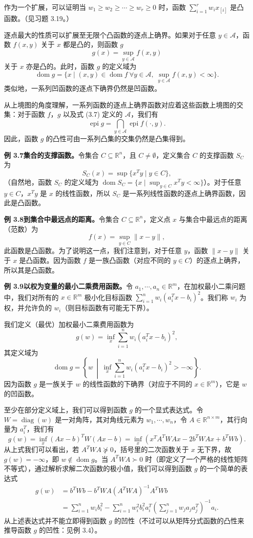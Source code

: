 \documentclass[UTF8,12pt,a4paper,fontset=fandol]{ctexart}
\DeclareMathOperator{\dom}{dom}
\DeclareMathOperator{\diag}{diag}
\DeclareMathOperator{\epi}{epi}
\begin{document}
作为一个扩展，可以证明当 $w_1\geq w_2\geq\cdots\geq w_r\geq0$ 时，函数 $\sum_{i=1}^r w_i x_{[i]}$ 是凸函数。（见习题 3.19。）

逐点最大的性质可以扩展至无限个凸函数的逐点上确界。如果对于任意 $y\in\mathcal{A}$，函数 $f(x,y)$ 关于 $x$ 都是凸的，则函数 $g$
\begin{equation}
g(x)=\sup_{y\in\mathcal{A}} f(x,y)
\tag{3.7}
\end{equation}
关于 $x$ 亦是凸的。此时，函数 $g$ 的定义域为
\[
\dom g=\{x\mid (x,y)\in\dom f\ \forall y\in\mathcal{A},\ \sup_{y\in\mathcal{A}} f(x,y)<\infty\}.
\]
类似地，一系列凹函数的逐点下确界仍然是凹函数。

从上境图的角度理解，一系列函数的逐点上确界函数对应着这些函数上境图的交集：对于函数 $f$，$g$ 以及式 (3.7) 定义的 $\mathcal{A}$，我们有
\[
\epi g=\bigcap_{y\in\mathcal{A}}\epi f(\cdot,y).
\]
因此，函数 $g$ 的凸性可由一系列凸集的交集仍然是凸集得到。

\noindent\textbf{例 3.7\quad 集合的支撑函数。}\quad 令集合 $C\subseteq\mathbb{R}^n$，且 $C\neq\emptyset$，定义集合 $C$ 的支撑函数 $S_C$ 为
\[
S_C(x)=\sup\{x^Ty\mid y\in C\},
\]
（自然地，函数 $S_C$ 的定义域为 $\dom S_C=\{x\mid \sup_{y\in C}x^Ty<\infty\}$）。对于任意 $y\in C$，$x^Ty$ 是 $x$ 的线性函数，所以 $S_C$ 是一系列线性函数的逐点上确界函数，因此是凸函数。

\noindent\textbf{例 3.8\quad 到集合中最远点的距离。}\quad 令集合 $C\subseteq\mathbb{R}^n$，定义点 $x$ 与集合中最远点的距离（范数）为
\[
f(x)=\sup_{y\in C}\|x-y\|,
\]
此函数是凸函数。为了说明这一点，我们注意到，对于任意 $y$，函数 $\|x-y\|$ 关于 $x$ 是凸函数。因为函数 $f$ 是一族凸函数（对应不同的 $y\in C$）的逐点上确界，所以其是凸函数。

\noindent\textbf{例 3.9\quad 以权为变量的最小二乘费用函数。}\quad 令 $a_1,\cdots,a_n\in\mathbb{R}^m$，在加权最小二乘问题中，我们对所有的 $x\in\mathbb{R}^m$ 极小化目标函数 $\sum_{i=1}^n w_i(a_i^Tx-b_i)^2$。我们称 $w_i$ 为权，并允许负的 $w_i$（则目标函数有可能无下界）。

我们定义（最优）加权最小二乘费用函数为
\[
g(w)=\inf_x\sum_{i=1}^n w_i(a_i^Tx-b_i)^2,
\]
其定义域为
\[
\dom g=\left\{w\ \middle|\ \inf_x\sum_{i=1}^n w_i(a_i^Tx-b_i)^2>-\infty\right\}.
\]
因为函数 $g$ 是一族关于 $w$ 的线性函数的下确界（对应于不同的 $x\in\mathbb{R}^m$），它是 $w$ 的凹函数。

至少在部分定义域上，我们可以得到函数 $g$ 的一个显式表达式。令 $W=\diag(w)$ 是一对角阵，其对角线元素为 $w_1,\cdots,w_n$，令 $A\in\mathbb{R}^{n\times m}$，其行向量为 $a_i^T$，我们有
\[
g(w)=\inf_x(Ax-b)^TW(Ax-b)
=\inf_x(x^TA^TWAx-2b^TWAx+b^TWb).
\]
从上式我们可以看出，若 $A^TWA\not\succeq0$，括号里的二次函数关于 $x$ 无下界，故 $g(w)=-\infty$，即 $w\notin\dom g$。当 $A^TWA\succ0$ 时（即定义了一个严格的线性矩阵不等式），通过解析求解二次函数的极小值，我们可以得到函数 $g$ 的一个简单的表达式
\[
\begin{aligned}
g(w)
&=b^TWb-b^TWA(A^TWA)^{-1}A^TWb\\
&=\sum_{i=1}^n w_i b_i^2-\sum_{i=1}^n w_i^2b_i^2a_i^T
\left(\sum_{j=1}^n w_ja_ja_j^T\right)^{-1}a_i.
\end{aligned}
\]
从上述表达式并不能立即得到函数 $g$ 的凹性（不过可以从矩阵分式函数的凸性来推导函数 $g$ 的凹性：见例 3.4）。
\end{document}
